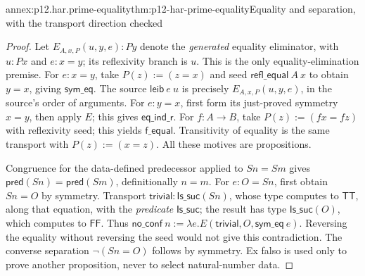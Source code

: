 \begin{annexitem}{annex:p12.har.prime-equality}{thm:p12-har-prime-equality}{Equality and separation, with the transport direction checked}
\begin{proof}
Let \(E_{A,x,P}(u,y,e):P y\) denote the \emph{generated} equality
eliminator, with \(u:P x\) and \(e:x=y\); its reflexivity branch is
\(u\). This is the only equality-elimination premise.
For \(e:x=y\), take \(P(z):=(z=x)\) and seed
\(\mathsf{refl\_equal}\ A\ x\) to obtain \(y=x\), giving
\(\mathsf{sym\_eq}\). The source \(\mathsf{leib}\ e\ u\) is precisely
\(E_{A,x,P}(u,y,e)\), in the source's order of arguments.
For \(e:y=x\), first form its just-proved symmetry \(x=y\), then
apply \(E\); this gives \(\mathsf{eq\_ind\_r}\).
For \(f:A\to B\), take \(P(z):=(f x=f z)\) with reflexivity seed;
this yields \(\mathsf{f\_equal}\). Transitivity of equality is the
same transport with \(P(z):=(x=z)\). All these motives are propositions.

Congruence for the data-defined predecessor applied to \(S n=S m\)
gives \(\mathsf{pred}(S n)=\mathsf{pred}(S m)\), definitionally \(n=m\).
For \(e:O=S n\), first obtain \(S n=O\) by symmetry. Transport
\(\mathsf{trivial}:\mathsf{Is\_suc}(S n)\), whose type computes to
\(\mathsf{TT}\), along that
equation, with the \emph{predicate} \(\mathsf{Is\_suc}\); the result
has type \(\mathsf{Is\_suc}(O)\), which computes to
\(\mathsf{FF}\). Thus
\(\mathsf{no\_conf}\ n:=\lambda e.E(\mathsf{trivial},O,
\mathsf{sym\_eq}\ e)\). Reversing the equality without reversing
the seed would not give this contradiction. The converse separation
\(\neg(S n=O)\) follows by symmetry. Ex falso is used only to
prove another proposition, never to select natural-number data.
\end{proof}
\end{annexitem}

